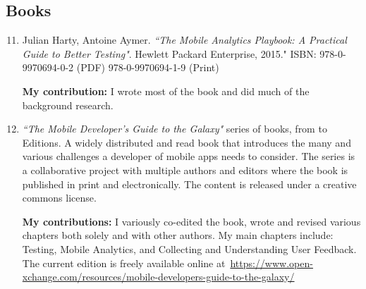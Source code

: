 \subsection{Books}
\begin{enumerate}
    \setcounter{enumi}{10}
    \item Julian Harty, Antoine Aymer. \emph{``The Mobile Analytics Playbook: A Practical Guide to Better Testing"}. Hewlett Packard Enterprise, 2015."
    ISBN: 978-0-9970694-0-2 (PDF) 978-0-9970694-1-9 (Print)
    
    \textbf{My contribution:} I wrote most of the book and did much of the background research.
    
    \item \emph{``The Mobile Developer's Guide to the Galaxy"} series of books, from  to  Editions. A widely distributed and read book that introduces the many and various challenges a developer of mobile apps needs to consider. The series is a collaborative project with multiple authors and editors where the book is published in print and electronically. The content is released under a creative commons license. 
    
    \textbf{My contributions:} I variously co-edited the book, wrote and revised various chapters both solely and with other authors. My main chapters include: Testing, Mobile Analytics, and Collecting and Understanding User Feedback. The current edition is freely available online at~\url{https://www.open-xchange.com/resources/mobile-developers-guide-to-the-galaxy/}
\end{enumerate}
\clearpage
